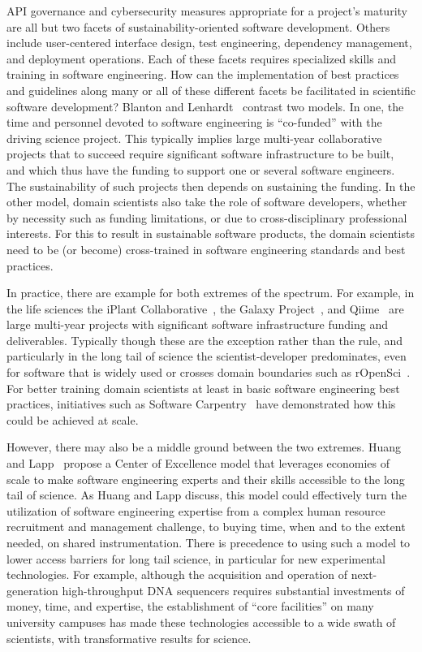 \documentclass[11pt, oneside]{amsart}
\newcommand{\toolname}[1] {\textsf{#1}}
\begin{document}
API governance and cybersecurity measures appropriate for a project's
maturity are all but two facets of sustainability-oriented software
development. Others include user-centered interface design, test
engineering, dependency management, and deployment operations. Each of
these facets requires specialized skills and training in software
engineering. How can the implementation of best practices and
guidelines along many or all of these different facets be facilitated
in scientific software development? Blanton and
Lenhardt~\cite{Blanton_WSSSPE} contrast two models. In one, the time
and personnel devoted to software engineering is ``co-funded'' with
the driving science project. This typically implies large multi-year
collaborative projects that to succeed require significant software
infrastructure to be built, and which thus have the funding to support
one or several software engineers. The sustainability of such projects
then depends on sustaining the funding. In the other model, domain
scientists also take the role of software developers, whether by
necessity such as funding limitations, or due to cross-disciplinary
professional interests. For this to result in sustainable software
products, the domain scientists need to be (or become) cross-trained
in software engineering standards and best practices.

In practice, there are example for both extremes of the spectrum. For
example, in the life sciences the iPlant Collaborative~\cite{iPlant},
the Galaxy Project~\cite{Galaxy}, and \toolname{Qiime}~\cite{Qiime}
are large multi-year projects with significant software infrastructure
funding and deliverables. Typically though these are the exception
rather than the rule, and particularly in the long tail of science the
scientist-developer predominates, even for software that is widely
used or crosses domain boundaries such as
\toolname{rOpenSci}~\cite{rOpenSci}. For better training domain
scientists at least in basic software engineering best practices,
initiatives such as Software Carpentry~\cite{SoftwareCarpentry} have
demonstrated how this could be achieved at scale.

However, there may also be a middle ground between the two
extremes. Huang and Lapp~\cite{Huang_WSSSPE} propose a Center of
Excellence model that leverages economies of scale to make software
engineering experts and their skills accessible to the long tail of
science. As Huang and Lapp discuss, this model could effectively turn
the utilization of software engineering expertise from a complex human
resource recruitment and management challenge, to buying time, when
and to the extent needed, on shared instrumentation. There is
precedence to using such a model to lower access barriers for long
tail science, in particular for new experimental technologies.  For
example, although the acquisition and operation of next-generation
high-throughput DNA sequencers requires substantial investments of
money, time, and expertise, the establishment of ``core facilities''
on many university campuses has made these technologies accessible to
a wide swath of scientists, with transformative results for science.
\end{document}
